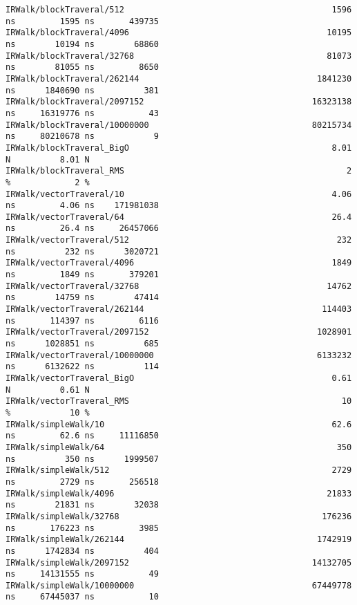\begin{code}
\begin{verbatim}
IRWalk/blockTraveral/512                                          1596 ns         1595 ns       439735
IRWalk/blockTraveral/4096                                        10195 ns        10194 ns        68860
IRWalk/blockTraveral/32768                                       81073 ns        81055 ns         8650
IRWalk/blockTraveral/262144                                    1841230 ns      1840690 ns          381
IRWalk/blockTraveral/2097152                                  16323138 ns     16319776 ns           43
IRWalk/blockTraveral/10000000                                 80215734 ns     80210678 ns            9
IRWalk/blockTraveral_BigO                                         8.01 N          8.01 N
IRWalk/blockTraveral_RMS                                             2 %             2 %
IRWalk/vectorTraveral/10                                          4.06 ns         4.06 ns    171981038
IRWalk/vectorTraveral/64                                          26.4 ns         26.4 ns     26457066
IRWalk/vectorTraveral/512                                          232 ns          232 ns      3020721
IRWalk/vectorTraveral/4096                                        1849 ns         1849 ns       379201
IRWalk/vectorTraveral/32768                                      14762 ns        14759 ns        47414
IRWalk/vectorTraveral/262144                                    114403 ns       114397 ns         6116
IRWalk/vectorTraveral/2097152                                  1028901 ns      1028851 ns          685
IRWalk/vectorTraveral/10000000                                 6133232 ns      6132622 ns          114
IRWalk/vectorTraveral_BigO                                        0.61 N          0.61 N
IRWalk/vectorTraveral_RMS                                           10 %            10 %
IRWalk/simpleWalk/10                                              62.6 ns         62.6 ns     11116850
IRWalk/simpleWalk/64                                               350 ns          350 ns      1999507
IRWalk/simpleWalk/512                                             2729 ns         2729 ns       256518
IRWalk/simpleWalk/4096                                           21833 ns        21831 ns        32038
IRWalk/simpleWalk/32768                                         176236 ns       176223 ns         3985
IRWalk/simpleWalk/262144                                       1742919 ns      1742834 ns          404
IRWalk/simpleWalk/2097152                                     14132705 ns     14131555 ns           49
IRWalk/simpleWalk/10000000                                    67449778 ns     67445037 ns           10

\end{verbatim}
\end{code}
